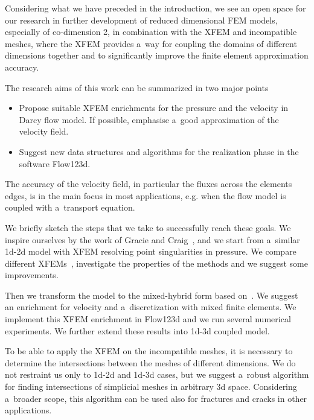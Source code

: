 Considering what we have preceded in the introduction, we see an open space for our research in further development of reduced dimensional FEM models,
especially of co-dimension 2, in combination with the XFEM and incompatible meshes, where the XFEM provides
a~way for coupling the domains of different dimensions together and to significantly improve the finite element approximation accuracy.

The research aims of this work can be summarized in two major points
\begin{itemize}
    \item Propose suitable XFEM enrichments for the pressure and the velocity in Darcy flow model. 
        If possible, emphasise a~good approximation of the velocity field.%
        
    \item Suggest new data structures and algorithms for the realization phase in the software Flow123d. 
\end{itemize}
The accuracy of the velocity field, in particular the fluxes across the elements edges, 
is in the main focus in most applications, e.g. when the flow model is coupled with a~transport equation.


We briefly sketch the steps that we take to successfully reach these goals.
We inspire ourselves by the work of Gracie and Craig~\cite{gracie_modelling_2010,craig_using_2011},
and we start from a~similar 1d-2d model with XFEM resolving point singularities in pressure.
We compare different XFEMs~\cite{fries_corrected_2008, fries_xfem_overview_2010, babuska_stable_2012,gupta_stable_2013},
investigate the properties of the methods and we suggest some improvements.

Then we transform the model to the mixed-hybrid form based on~\cite{brezina_mixed-hybrid_2010, sistek_bddc_2015}.
We suggest an enrichment for velocity and a~discretization with mixed finite elements.
We implement this XFEM enrichment in Flow123d and we run several numerical experiments.
We further extend these results into 1d-3d coupled model.

To be able to apply the XFEM on the incompatible meshes, it is necessary to determine the intersections
between the meshes of different dimensions. We do not restraint us only to 1d-2d and 1d-3d cases, but we suggest
a~robust algorithm for finding intersections of simplicial meshes in arbitrary 3d space.
Considering a~broader scope, this algorithm can be used also for fractures and cracks in other applications.


